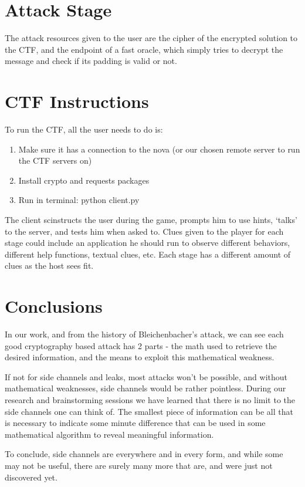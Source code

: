 \documentclass[sigconf]{acmart}
\begin{document}
\section{Attack Stage}
The attack resources given to the user are the cipher of the encrypted solution to the CTF, and the endpoint of a fast oracle, which simply tries to decrypt the message and check if its padding is valid or not.

\section{CTF Instructions}
To run the CTF, all the user needs to do is:

\begin{enumerate}
    \item Make sure it has a connection to the nova (or our chosen remote server to run the CTF servers on)
    \item Install crypto and requests packages 
    \item Run in terminal: python client.py 
\end{enumerate}

The client scinstructs the user during the game, prompts him to use hints, ‘talks’ to the server, and tests him when asked to. Clues given to the player for each stage could include an application he should run to observe different behaviors, different help functions, textual clues, etc. Each stage has a different amount of clues as the host sees fit. 

\section{Conclusions}
In our work, and from the history of Bleichenbacher’s attack, we can see each good cryptography based attack has 2 parts - the math used to retrieve the desired information, and the means to exploit this mathematical weakness.

If not for side channels and leaks, most attacks won’t be possible, and without mathematical weaknesses, side channels would be rather pointless.
During our research and brainstorming sessions we have learned that there is no limit to the side channels one can think of. The smallest piece of information can be all that is necessary to indicate some minute difference that can be used in some mathematical algorithm to reveal meaningful information.

To conclude, side channels are everywhere and in every form, and while some may not be useful, there are surely many more that are, and were just not discovered yet.
\end{document}
